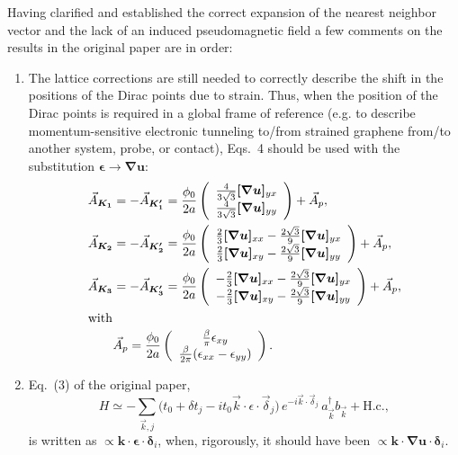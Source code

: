 Having clarified and established the correct expansion of the nearest neighbor vector and the lack of an induced pseudomagnetic field a few comments on the results in the original paper are in order:
%
\begin{enumerate} \renewcommand{\theenumi}{\roman{enumi}}
  \item The lattice corrections are still needed to correctly describe the shift in the positions of the Dirac points due to strain. Thus, when the position of the Dirac points is required in a global frame of reference (e.g. to describe momentum-sensitive electronic tunneling to/from strained graphene from/to another system, probe, or contact), Eqs.~4 should be used with the substitution $\bm{\epsilon } \to \bm{\nabla u}$:
%
	\begin{align*}
	\vec{A}_{\bm{K_1}}&=-\vec{A}_{\bm{K_1'}}=\frac{\phi_0}{2a} \left(
\begin{array}{c} \frac{4}{3\sqrt{3}}\bm{[\nabla u]}_{yx}\\ \frac{4}{3
\sqrt{3}} \bm{[\nabla u]}_{yy} \end{array} \right) +\vec{A}_p , \\ 
	\vec{A}_{\bm{K_2}}&=-\vec{A}_{\bm{K_2'}}=\frac{\phi_0}{2a} \left(
\begin{array}{c} \frac{2}{3}\bm{[\nabla u]}_{xx}-\frac{2\sqrt{3}}{9}
\bm{[\nabla u]}_{yx} \\ \frac{2}{3} \bm{[\nabla u]}_{xy}-\frac{2
\sqrt{3}}{9} \bm{[\nabla u]}_{yy} \end{array} \right)+\vec{A}_p  ,  \\
	\vec{A}_{\bm{K_3}}&=-\vec{A}_{\bm{K_3'}}=\frac{\phi_0}{2a} \left(
\begin{array}{c} -\frac{2}{3} \bm{[\nabla u]}_{xx}-\frac{2
\sqrt{3}}{9} \bm{[\nabla u]}_{yx} \\ -\frac{2}{3} \bm{[\nabla
u]}_{xy}-\frac{2 \sqrt{3}}{9} \bm{[\nabla u]}_{yy} \end{array}
\right)+\vec{A}_p  , \\
	\intertext{with}
	&\vec{A}_p=\frac{\phi_0}{2a} \left( \begin{array}{c} \frac{\beta }{\pi} \epsilon_{xy} \\ \frac{\beta }{2 \pi} (\epsilon_{xx}-\epsilon_{yy}) \end{array} \right).
	\end{align*}
%
  \item Eq.~(3) of the original paper,
\begin{equation*}
  H \simeq -\sum_{\vec{k},j} \bigl(
  t_0 + \delta t_j - it_0\vec{k}\cdot\epsilon\cdot\vec{\delta}_j
  \bigr) \, e^{-i\vec{k}\cdot\vec{\delta}_j} \,
  a_{\vec{k}}^{\dagger}b_{\vec{k}} + \text{H.c.}
  ,
\end{equation*}
is written as $\propto \bm{k}\cdot\bm{\epsilon}\cdot\bm{\delta}_i$, when, rigorously, it should have been $\propto\bm{k}\cdot\bm{\nabla u}\cdot\bm{\delta}_i$.
\end{enumerate}